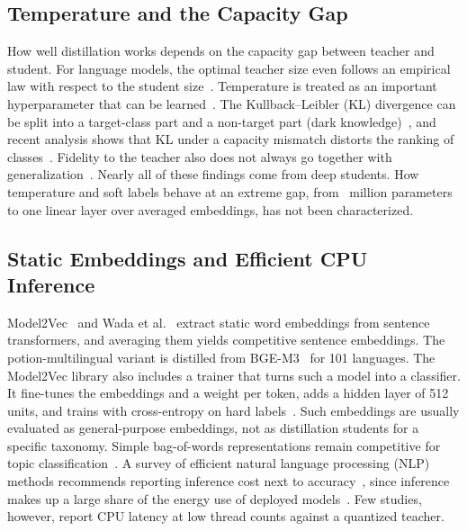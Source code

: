 \subsection{Temperature and the Capacity Gap}
How well distillation works depends on the capacity gap between teacher and student. For language models, the optimal teacher size even follows an empirical law with respect to the student size~\cite{zhang2025law}. Temperature is treated as an important hyperparameter that can be learned~\cite{li2023ctkd}. The Kullback--Leibler (KL) divergence can be split into a target-class part and a non-target part (dark knowledge)~\cite{zhao2022dkd}, and recent analysis shows that KL under a capacity mismatch distorts the ranking of classes~\cite{wang2026rckd}. Fidelity to the teacher also does not always go together with generalization~\cite{stanton2021kd}. Nearly all of these findings come from deep students. How temperature and soft labels behave at an extreme gap, from ~million parameters to one linear layer over averaged embeddings, has not been characterized.

\subsection{Static Embeddings and Efficient CPU Inference}
Model2Vec~\cite{tulkens2024model2vec} and Wada et al.~\cite{wada2025static} extract static word embeddings from sentence transformers, and averaging them yields competitive sentence embeddings. The potion-multilingual variant is distilled from BGE-M3~\cite{chen2024bgem3} for 101 languages. The Model2Vec library also includes a trainer that turns such a model into a classifier. It fine-tunes the embeddings and a weight per token, adds a hidden layer of 512 units, and trains with cross-entropy on hard labels~\cite{tulkens2024model2vec}. Such embeddings are usually evaluated as general-purpose embeddings, not as distillation students for a specific taxonomy. Simple bag-of-words representations remain competitive for topic classification~\cite{galke2022bow}. A survey of efficient natural language processing (NLP) methods recommends reporting inference cost next to accuracy~\cite{treviso2023efficient}, since inference makes up a large share of the energy use of deployed models~\cite{luccioni2024power}. Few studies, however, report CPU latency at low thread counts against a quantized teacher.

